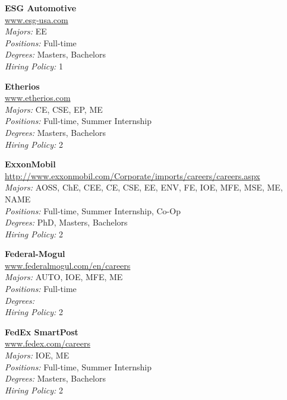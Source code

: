 \documentclass{article}
\begin{document}
\begin{center}
\begin{multicols}{3}
\begin{minipage}{.9\columnwidth}{\Large\bf ESG Automotive }\\
	\url{www.esg-usa.com}\\
	\emph{Majors:} EE\\
	\emph{Positions:} Full-time\\
	\emph{Degrees:} Masters, Bachelors\\
	\emph{Hiring Policy:} 1\\
\end{minipage}
 
\begin{minipage}{.9\columnwidth}{\Large\bf Etherios }\\
	\url{www.etherios.com}\\
	\emph{Majors:} CE, CSE, EP, ME\\
	\emph{Positions:} Full-time, Summer Internship\\
	\emph{Degrees:} Masters, Bachelors\\
	\emph{Hiring Policy:} 2\\
\end{minipage}
 
\begin{minipage}{.9\columnwidth}{\Large\bf ExxonMobil }\\
	\url{http://www.exxonmobil.com/Corporate/imports/careers/careers.aspx}\\
	\emph{Majors:} AOSS, ChE, CEE, CE, CSE, EE, ENV, FE, IOE, MFE, MSE, ME, NAME\\
	\emph{Positions:} Full-time, Summer Internship, Co-Op\\
	\emph{Degrees:} PhD, Masters, Bachelors\\
	\emph{Hiring Policy:} 2\\
\end{minipage}
 
\begin{minipage}{.9\columnwidth}{\Large\bf Federal-Mogul }\\
	\url{www.federalmogul.com/en/careers}\\
	\emph{Majors:} AUTO, IOE, MFE, ME\\
	\emph{Positions:} Full-time\\
	\emph{Degrees:} \\
	\emph{Hiring Policy:} 2\\
\end{minipage}
 
\begin{minipage}{.9\columnwidth}{\Large\bf FedEx SmartPost }\\
	\url{www.fedex.com/careers}\\
	\emph{Majors:} IOE, ME\\
	\emph{Positions:} Full-time, Summer Internship\\
	\emph{Degrees:} Masters, Bachelors\\
	\emph{Hiring Policy:} 2\\
\end{minipage}
 

\end{multicols}
\end{center}
\end{document}
